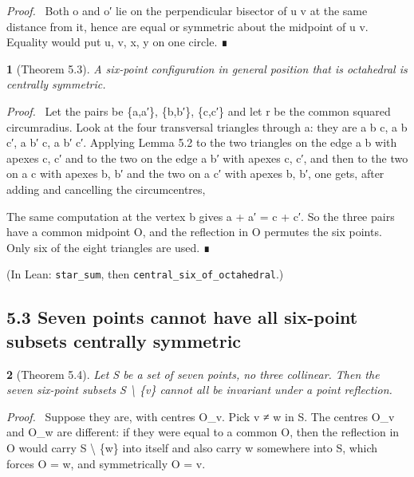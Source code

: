 \documentclass[11pt,a4paper]{article}
\theoremstyle{named}
\newtheorem*{namedthm}{}
\newenvironment{mdproof}[1][Proof]{\par\medskip\noindent\textit{#1.}\ }{\par\medskip}
\newcommand{\dispf}[1]{\par\smallskip{\centering #1\par}\smallskip}
\begin{document}
\begin{mdproof}[Proof]
Both o and o′ lie on the perpendicular bisector of u v at the same distance from it, hence are equal or symmetric about the midpoint of u v. Equality would put u, v, x, y on one circle. ∎
\end{mdproof}

\begin{namedthm}[Theorem 5.3]
A six-point configuration in general position that is octahedral is centrally symmetric.
\end{namedthm}

\begin{mdproof}[Proof]
Let the pairs be \{a,a′\}, \{b,b′\}, \{c,c′\} and let r be the common squared circumradius. Look at the four transversal triangles through a: they are a b c, a b c′, a b′ c, a b′ c′. Applying Lemma 5.2 to the two triangles on the edge a b with apexes c, c′ and to the two on the edge a b′ with apexes c, c′, and then to the two on a c with apexes b, b′ and the two on a c′ with apexes b, b′, one gets, after adding and cancelling the circumcentres,
\end{mdproof}

\dispf{b + b′ = c + c′.}

The same computation at the vertex b gives a + a′ = c + c′. So the three pairs have a common midpoint O, and the reflection in O permutes the six points. Only six of the eight triangles are used. ∎

(In Lean: \texttt{star\_\allowbreak{}sum}, then \texttt{central\_\allowbreak{}six\_\allowbreak{}of\_\allowbreak{}octahedral}.)

\subsection*{5.3 Seven points cannot have all six-point subsets centrally symmetric}

\begin{namedthm}[Theorem 5.4]
Let S be a set of seven points, no three collinear. Then the seven six-point subsets S \textbackslash{} \{v\} cannot all be invariant under a point reflection.
\end{namedthm}

\begin{mdproof}[Proof]
Suppose they are, with centres O\_v. Pick v ≠ w in S. The centres O\_v and O\_w are different: if they were equal to a common O, then the reflection in O would carry S \textbackslash{} \{w\} into itself and also carry w somewhere into S, which forces O = w, and symmetrically O = v.
\end{mdproof}
\end{document}
